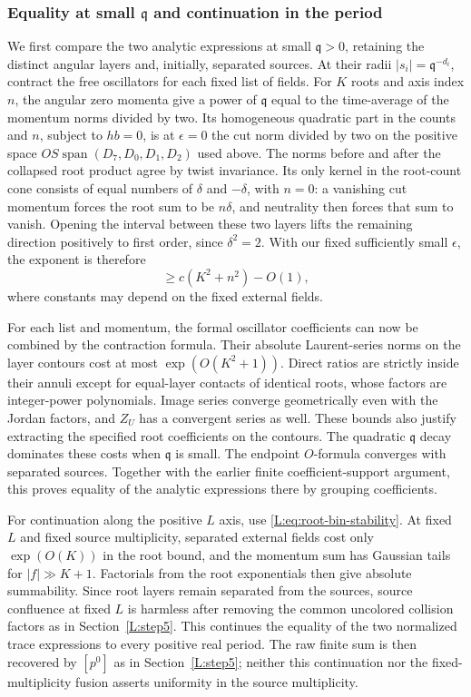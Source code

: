 \subsubsection*{Equality at small $\mathfrak q$ and continuation in the period}

We first compare the two analytic expressions at small
$\mathfrak q>0$, retaining the distinct angular layers and, initially,
separated sources. At their radii $|s_i|=\mathfrak q^{-d_i}$, contract
the free oscillators for each fixed list of fields. For $K$ roots and
axis index $n$, the angular zero momenta give a power of $\mathfrak q$
equal to the time-average of the momentum norms divided by two. Its
homogeneous quadratic part in the counts and $n$, subject to $hb=0$,
is at $\epsilon=0$ the cut norm divided by two on the positive space
$OS\operatorname{span}(D_7,D_0,D_1,D_2)$ used above. The norms before
and after the collapsed root product agree by twist invariance. Its only
kernel in the root-count cone consists of equal numbers of $\delta$
and $-\delta$, with $n=0$: a vanishing cut momentum forces the root sum
to be $n\delta$, and neutrality then forces that sum to vanish.
Opening the interval between these two layers lifts the remaining
direction positively to first order, since $\delta^2=2$. With our fixed
sufficiently small $\epsilon$, the exponent is therefore
\[
 \ge c(K^2+n^2)-O(1),
\]
where constants may depend on the fixed external fields.

For each list and momentum, the formal oscillator coefficients can now
be combined by the contraction formula. Their absolute Laurent-series
norms on the layer contours cost at most $\exp(O(K^2+1))$. Direct ratios
are strictly inside their annuli except for equal-layer contacts of
identical roots, whose factors are integer-power polynomials. Image
series converge geometrically even with the Jordan factors, and $Z_U$
has a convergent series as well. These bounds also justify extracting
the specified root coefficients on the contours. The quadratic
$\mathfrak q$ decay dominates these costs when $\mathfrak q$ is small.
The endpoint $O$-formula converges with separated sources. Together with
the earlier finite coefficient-support argument, this proves equality
of the analytic expressions there by grouping coefficients.

For continuation along the positive $L$ axis, use
\eqref{L:eq:root-bin-stability}. At fixed $L$ and fixed source
multiplicity, separated external fields cost only $\exp(O(K))$ in the
root bound, and the momentum sum has Gaussian tails for
$|f|\gg K+1$. Factorials from the root exponentials then give absolute
summability. Since root layers remain separated from the sources,
source confluence at fixed $L$ is harmless after removing the common
uncolored collision factors as in Section~\ref{L:step5}. This continues the equality of the two normalized trace expressions
to every positive real period. The raw finite sum is then recovered by
$[p^0]$ as in Section~\ref{L:step5}; neither this continuation nor the
fixed-multiplicity fusion asserts uniformity in the source multiplicity.


